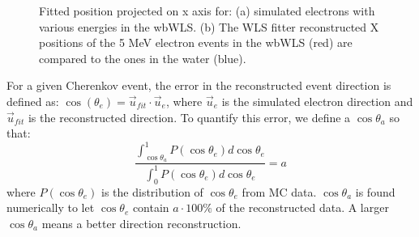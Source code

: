 \documentclass[preprint,12pt]{elsarticle}
\numberwithin{equation}{section}
\begin{document}
\begin{figure}[htbp]	
	\centering	
	\caption{\label{WLSFitPos} Fitted position projected on x axis for: (a) simulated electrons with various energies in the wbWLS. (b) The WLS fitter reconstructed X positions of the 5 MeV electron events in the wbWLS (red) are compared to the ones in the water (blue).
	}
\end{figure}

For a given Cherenkov event, the error in the reconstructed event direction is defined as\cite{boulay}: $\cos(\theta_e)=\vec{u}_{fit}\cdot\vec{u}_e$, where $\vec{u}_e$ is the simulated electron direction and $\vec{u}_{fit}$ is the reconstructed direction. To quantify this error, we define a $\cos\theta_{a}$ so that:
\[
\frac{\int_{\cos\theta_{a}}^1 P(\cos\theta_e) d\cos\theta_e}{\int_0^1 P(\cos\theta_e) d\cos\theta_e} = a
\] 
where $P(\cos\theta_e)$ is the distribution of $\cos\theta_e$ from MC data. $\cos\theta_{a}$ is found numerically to let $\cos\theta_e$ contain $ a\cdot 100\%$ of the reconstructed data. A larger $\cos\theta_{a}$ means a better direction reconstruction.
\end{document}
